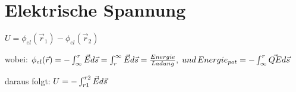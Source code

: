 
\section*{Elektrische Spannung}

$U=\phi_{el}(\vec{r}_{1})-\phi_{el}(\vec{r}_{2})$

wobei: $\phi_{el}(\vec{r})=-\intop_{\infty}^{r}\vec{E}d\vec{s}=\intop_{r}^{\infty}\vec{E}d\vec{s}=\frac{Energie}{Ladung},\; und\, Energie_{pot}=-\intop_{\infty}^{r}\vec{QE}d\vec{s}$

daraus folgt: $U=-\intop_{r1}^{r2}\vec{E}d\vec{s}$
